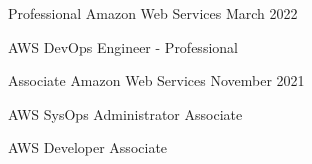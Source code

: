 

\begin{cventries}

    \cventry
    {Professional} %
    {Amazon Web Services} %
    {} %
    {March 2022} %
    {
      \begin{cvitems} %
        \item {AWS DevOps Engineer - Professional}
      \end{cvitems}
    }

    \cventry
    {Associate} %
    {Amazon Web Services} %
    {} %
    {November 2021} %
    {
      \begin{cvitems} %
        \item {AWS SysOps Administrator Associate}
        \item {AWS Developer Associate}
      \end{cvitems}
    }

\end{cventries}
